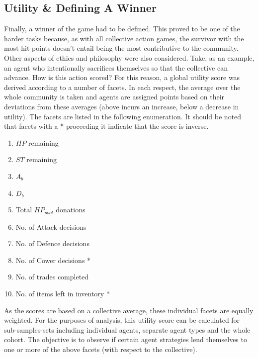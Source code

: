 \subsection{Utility \& Defining A Winner}\label{sec: winner}

Finally, a winner of the game had to be defined. This proved to be one of the harder tasks because, as with all collective action games, the survivor with the most hit-points doesn't entail being the most contributive to the community. Other aspects of ethics and philosophy were also considered. Take, as an example, an agent who intentionally sacrifices themselves so that the collective can advance. How is this action scored? For this reason, a global utility score was derived according to a number of facets. In each respect, the average over the whole community is taken and agents are assigned points based on their deviations from these averages (above incurs an increase, below a decrease in utility). The facets are listed in the following enumeration. It should be noted that facets with a * proceeding it indicate that the score is inverse. 

\begin{enumerate}
    \item $HP$ remaining
    \item $ST$ remaining
    \item $A_b$
    \item $D_b$
    \item Total $HP_{pool}$ donations 
    \item No. of Attack decisions
    \item No. of Defence decisions
    \item No. of Cower decisions * 
    \item No. of trades completed
    \item No. of items left in inventory *
\end{enumerate}

As the scores are based on a collective average, these individual facets are equally weighted. For the purposes of analysis, this utility score can be calculated for sub-samples-sets including individual agents, separate agent types and the whole cohort. The objective is to observe if certain agent strategies lend themselves to one or more of the above facets (with respect to the collective). 


